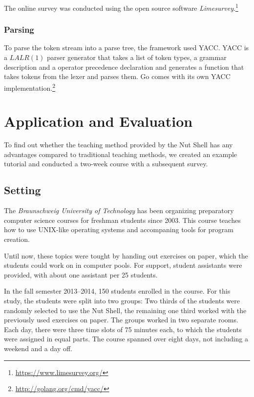 \documentclass[paper=a4,twoside,abstract=on,cleardoublepage=empty,numbers=noenddot,toc=bib,toc=listof,12pt,appendixprefix=true]{scrreprt}
\begin{document}
The online survey was conducted using the open source software \emph{Limesurvey}.\footnote{\url{https://www.limesurvey.org/}}

\subsection*{Parsing}

To parse the token stream into a parse tree, the framework used \textsc{YACC}. \textsc{YACC} is a $LALR(1)$ parser generator that takes a list of token types, a grammar description and a operator precedence declaration and generates a function that takes tokens from the lexer and parses them. Go comes with its own YACC implementation.\footnote{\url{http://golang.org/cmd/yacc/}}


\chapter{Application and Evaluation}
\label{sec:evaluation}

To find out whether the teaching method provided by the Nut Shell has any advantages compared to traditional teaching methods, we created an example tutorial and conducted a two-week course with a subsequent survey.

\section{Setting}

The \textit{Braunschweig University of Technology} has been organizing preparatory computer science courses for freshman students since 2003. This course teaches how to use UNIX-like operating systems and accompaning tools for program creation.

Until now, these topics were tought by handing out exercises on paper, which the students could work on in computer pools. For support, student assistants were provided, with about one assistant per 25 students.

In the fall semester 2013--2014, 150 students enrolled in the course. For this study, the students were split into two groups: Two thirds of the students were randomly selected to use the Nut Shell, the remaining one third worked with the previously used exercises on paper. The groups worked in two separate rooms. Each day, there were three time slots of 75 minutes each, to which the students were assigned in equal parts. The course spanned over eight days, not including a weekend and a day off.
\end{document}
